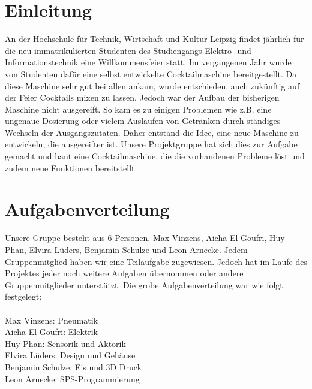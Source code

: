 \documentclass[10pt,a4paper]{report}
\begin{document}
	\newpage
	\tableofcontents
	
	\chapter{Einleitung}
	An der Hochschule für Technik, Wirtschaft und Kultur Leipzig findet jährlich für die neu immatrikulierten Studenten des Studiengangs Elektro- und Informationstechnik eine Willkommensfeier statt. Im vergangenen Jahr wurde von Studenten dafür eine selbst entwickelte Cocktailmaschine bereitgestellt. Da diese Maschine sehr gut bei allen ankam, wurde entschieden, auch zukünftig auf der Feier Cocktails mixen zu lassen. Jedoch war der Aufbau der bisherigen Maschine nicht ausgereift. So kam es zu einigen Problemen wie z.B. eine ungenaue Dosierung oder vielem Auslaufen von Getränken durch ständiges Wechseln der Ausgangszutaten. Daher entstand die Idee, eine neue Maschine zu entwickeln, die ausgereifter ist. Unsere Projektgruppe hat sich dies zur Aufgabe gemacht und baut eine Cocktailmaschine, die die vorhandenen Probleme löst und zudem neue Funktionen bereitstellt.
	
	\chapter{Aufgabenverteilung}
	
	Unsere Gruppe besteht aus 6 Personen. Max Vinzens, Aicha El Goufri, Huy Phan, Elvira Lüders, Benjamin Schulze und Leon Arnecke. Jedem Gruppenmitglied haben wir eine Teilaufgabe zugewiesen. Jedoch hat im Laufe des Projektes jeder noch weitere Aufgaben übernommen oder andere Gruppenmitglieder unterstützt. Die grobe Aufgabenverteilung war wie folgt festgelegt:\\ \\Max Vinzens: Pneumatik \\Aicha El Goufri: Elektrik \\Huy Phan: Sensorik und Aktorik \\Elvira Lüders: Design und Gehäuse \\Benjamin Schulze: Eis und 3D Druck \\Leon Arnecke: SPS-Programmierung
	
\end{document}
